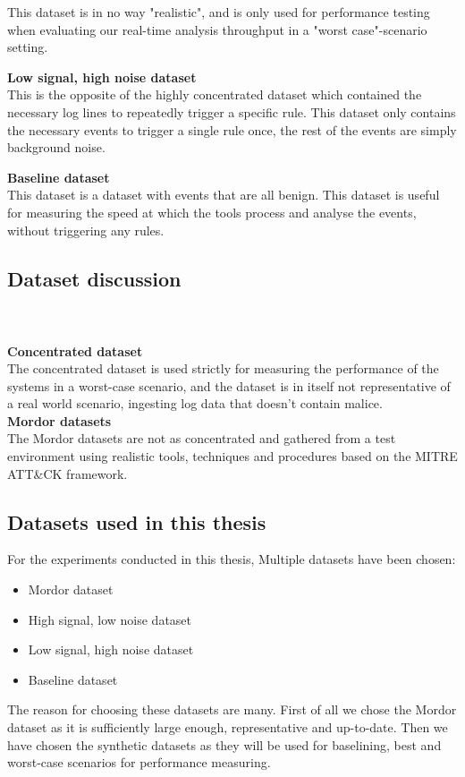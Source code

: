 This dataset is in no way "realistic", and is only used for performance testing when evaluating our real-time analysis throughput in a "worst case"-scenario setting.

\textbf{Low signal, high noise dataset}\\
This is the opposite of the highly concentrated dataset which contained the necessary log lines to repeatedly trigger a specific rule. This dataset only contains the necessary events to trigger a single rule once, the rest of the events are simply background noise.

\textbf{Baseline dataset}\\
This dataset is a dataset with events that are all benign. This dataset is useful for measuring the speed at which the tools process and analyse the events, without triggering any rules.

\subsection{Dataset discussion}
\\
\\
\textbf{Concentrated dataset}\\
The concentrated dataset is used strictly for measuring the performance of the systems in a worst-case scenario, and the dataset is in itself not representative of a real world scenario, ingesting log data that doesn't contain malice.\\
\textbf{Mordor datasets}\\
The Mordor datasets are not as concentrated and gathered from a test environment using realistic tools, techniques and procedures based on the MITRE ATT\&CK framework.

\subsection{Datasets used in this thesis}
\label{sec:datasets-used}

For the experiments conducted in this thesis, Multiple datasets have been chosen:

\begin{itemize}
    \item Mordor dataset
    \item High signal, low noise dataset
    \item Low signal, high noise dataset
    \item Baseline dataset
\end{itemize}
The reason for choosing these datasets are many. First of all we chose the Mordor dataset as it is sufficiently large enough, representative and up-to-date. Then we have chosen the synthetic datasets as they will be used for baselining, best and worst-case scenarios for performance measuring.

